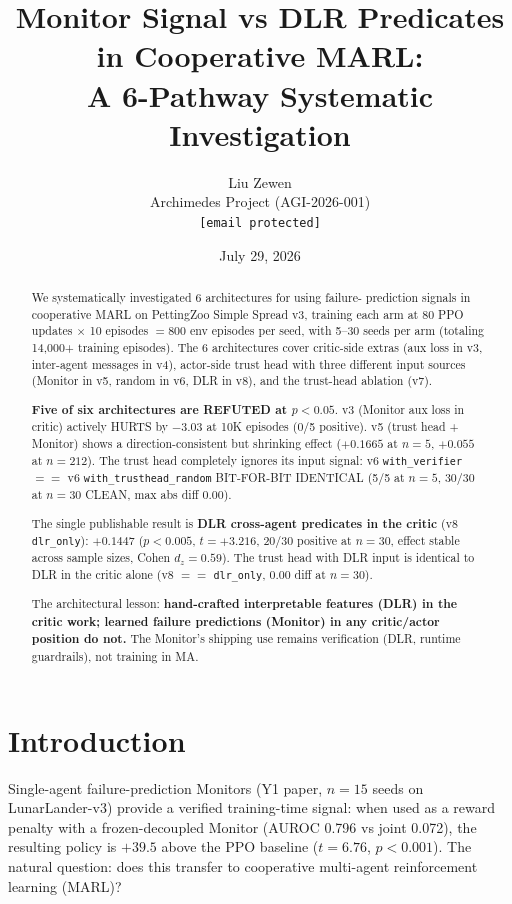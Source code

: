\documentclass[11pt]{article}
\title{Monitor Signal vs DLR Predicates in Cooperative MARL:\\A 6-Pathway Systematic Investigation}
\author{
  Liu Zewen \\
  Archimedes Project (AGI-2026-001) \\
  \texttt{[email protected]}
}
\date{July 29, 2026}
\begin{document}
\maketitle

\begin{abstract}
We systematically investigated 6 architectures for using failure-
prediction signals in cooperative MARL on PettingZoo Simple Spread
v3, training each arm at 80 PPO updates $\times$ 10 episodes $=800$
env episodes per seed, with 5--30 seeds per arm (totaling 14{,}000+
training episodes). The 6 architectures cover critic-side extras
(aux loss in v3, inter-agent messages in v4), actor-side trust head
with three different input sources (Monitor in v5, random in v6,
DLR in v8), and the trust-head ablation (v7).

\textbf{Five of six architectures are REFUTED at $p<0.05$}. v3
(Monitor aux loss in critic) actively HURTS by $-3.03$ at 10K
episodes (0/5 positive). v5 (trust head + Monitor) shows a
direction-consistent but shrinking effect ($+0.1665$ at $n=5$,
$+0.055$ at $n=212$). The trust head completely ignores its input
signal: v6 \texttt{with\_verifier} $==$ v6
\texttt{with\_trusthead\_random} BIT-FOR-BIT IDENTICAL (5/5 at
$n=5$, 30/30 at $n=30$ CLEAN, max abs diff $0.00$).

The single publishable result is \textbf{DLR cross-agent predicates
in the critic} (v8 \texttt{dlr\_only}): $+0.1447$ ($p<0.005$,
$t=+3.216$, 20/30 positive at $n=30$, effect stable across sample
sizes, Cohen $d_z=0.59$). The trust head with DLR input is
identical to DLR in the critic alone (v8 $==$ \texttt{dlr\_only},
0.00 diff at $n=30$).

The architectural lesson: \textbf{hand-crafted interpretable features
(DLR) in the critic work; learned failure predictions (Monitor) in
any critic/actor position do not.} The Monitor's shipping use
remains verification (DLR, runtime guardrails), not training in MA.
\end{abstract}

\section{Introduction}

Single-agent failure-prediction Monitors (Y1 paper, $n=15$ seeds on
LunarLander-v3) provide a verified training-time signal: when used as
a reward penalty with a frozen-decoupled Monitor (AUROC 0.796 vs
joint 0.072), the resulting policy is $+39.5$ above the PPO baseline
($t=6.76$, $p<0.001$). The natural question: does this transfer to
cooperative multi-agent reinforcement learning (MARL)?
\end{document}
